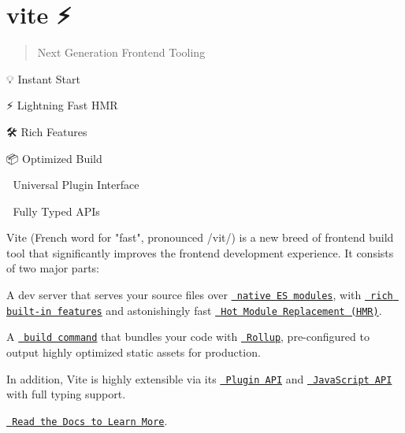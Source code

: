 \chapter{vite ⚡}
\hypertarget{md__2home_2solype_2delivery_2current__days_2Mannheim_2front_2node__modules_2vite_2README}{}\label{md__2home_2solype_2delivery_2current__days_2Mannheim_2front_2node__modules_2vite_2README}
\label{md__2home_2solype_2delivery_2current__days_2Mannheim_2front_2node__modules_2vite_2README_autotoc_md7248}%
%
 \begin{quote}
Next Generation Frontend Tooling \end{quote}

\begin{DoxyItemize}
\item 💡 Instant  Start
\item ⚡️ Lightning Fast HMR
\item 🛠️ Rich Features
\item 📦 Optimized Build
\item 🔩 Universal Plugin Interface
\item 🔑 Fully Typed APIs
\end{DoxyItemize}

Vite (French word for "{}fast"{}, pronounced {\ttfamily /vit/}) is a new breed of frontend build tool that significantly improves the frontend development experience. It consists of two major parts\+:


\begin{DoxyItemize}
\item A dev server that serves your source files over \href{https://developer.mozilla.org/en-US/docs/Web/JavaScript/Guide/Modules}{\texttt{ native ES modules}}, with \href{https://vite.dev/guide/features.html}{\texttt{ rich built-\/in features}} and astonishingly fast \href{https://vite.dev/guide/features.html\#hot-module-replacement}{\texttt{ Hot Module Replacement (HMR)}}.
\item A \href{https://vite.dev/guide/build.html}{\texttt{ build command}} that bundles your code with \href{https://rollupjs.org}{\texttt{ Rollup}}, pre-\/configured to output highly optimized static assets for production.
\end{DoxyItemize}

In addition, Vite is highly extensible via its \href{https://vite.dev/guide/api-plugin.html}{\texttt{ Plugin API}} and \href{https://vite.dev/guide/api-javascript.html}{\texttt{ Java\+Script API}} with full typing support.

\href{https://vite.dev}{\texttt{ Read the Docs to Learn More}}. 
